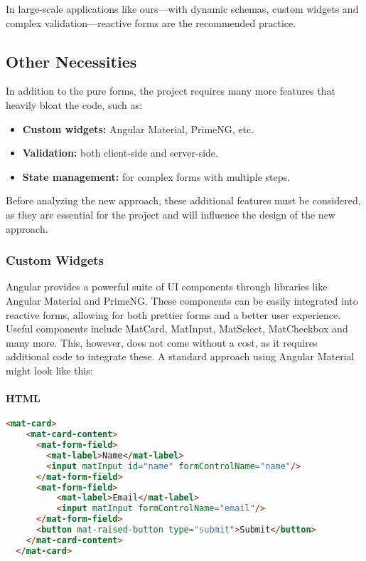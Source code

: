 In large‐scale applications like ours—with dynamic schemas, custom widgets and complex validation—reactive forms are
the recommended practice.

\subsection{Other Necessities}
In addition to the pure forms, the project requires many more features that heavily bloat the code, such as:

\begin{itemize}
  \item \textbf{Custom widgets:} Angular Material, PrimeNG, etc.
  \item \textbf{Validation:} both client-side and server-side.
  \item \textbf{State management:} for complex forms with multiple steps.
\end{itemize}

Before analyzing the new approach, these additional features must be considered, as they are essential for the
project and will influence the design of the new approach.

\subsubsection{Custom Widgets}

Angular provides a powerful suite of UI components through libraries like Angular Material and PrimeNG\@.
These components can be easily integrated into reactive forms, allowing for both prettier forms and a better user
experience.
Useful components include MatCard, MatInput, MatSelect, MatCheckbox and many more.
This, however, does not come without a cost, as it requires additional code to integrate these.
A standard approach using Angular Material might look like this:

\paragraph{HTML}
\begin{lstlisting}[language=HTML]
  <mat-card>
    <mat-card-content>
      <mat-form-field>
        <mat-label>Name</mat-label>
        <input matInput id="name" formControlName="name"/>
      </mat-form-field>
      <mat-form-field>
          <mat-label>Email</mat-label>
          <input matInput formControlName="email"/>
      </mat-form-field>
      <button mat-raised-button type="submit">Submit</button>
    </mat-card-content>
  </mat-card>
\end{lstlisting}


